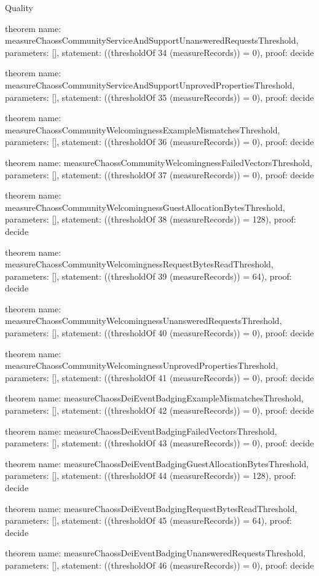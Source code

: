 \begin{lexlean}{Quality}
\begin{semanticmodule}
theorem{
  name: measureChaossCommunityServiceAndSupportUnansweredRequestsThreshold,
  parameters: [],
  statement: ((thresholdOf 34 (measureRecords)) = 0),
  proof: decide{}
}

theorem{
  name: measureChaossCommunityServiceAndSupportUnprovedPropertiesThreshold,
  parameters: [],
  statement: ((thresholdOf 35 (measureRecords)) = 0),
  proof: decide{}
}

theorem{
  name: measureChaossCommunityWelcomingnessExampleMismatchesThreshold,
  parameters: [],
  statement: ((thresholdOf 36 (measureRecords)) = 0),
  proof: decide{}
}

theorem{
  name: measureChaossCommunityWelcomingnessFailedVectorsThreshold,
  parameters: [],
  statement: ((thresholdOf 37 (measureRecords)) = 0),
  proof: decide{}
}

theorem{
  name: measureChaossCommunityWelcomingnessGuestAllocationBytesThreshold,
  parameters: [],
  statement: ((thresholdOf 38 (measureRecords)) = 128),
  proof: decide{}
}

theorem{
  name: measureChaossCommunityWelcomingnessRequestBytesReadThreshold,
  parameters: [],
  statement: ((thresholdOf 39 (measureRecords)) = 64),
  proof: decide{}
}

theorem{
  name: measureChaossCommunityWelcomingnessUnansweredRequestsThreshold,
  parameters: [],
  statement: ((thresholdOf 40 (measureRecords)) = 0),
  proof: decide{}
}

theorem{
  name: measureChaossCommunityWelcomingnessUnprovedPropertiesThreshold,
  parameters: [],
  statement: ((thresholdOf 41 (measureRecords)) = 0),
  proof: decide{}
}

theorem{
  name: measureChaossDeiEventBadgingExampleMismatchesThreshold,
  parameters: [],
  statement: ((thresholdOf 42 (measureRecords)) = 0),
  proof: decide{}
}

theorem{
  name: measureChaossDeiEventBadgingFailedVectorsThreshold,
  parameters: [],
  statement: ((thresholdOf 43 (measureRecords)) = 0),
  proof: decide{}
}

theorem{
  name: measureChaossDeiEventBadgingGuestAllocationBytesThreshold,
  parameters: [],
  statement: ((thresholdOf 44 (measureRecords)) = 128),
  proof: decide{}
}

theorem{
  name: measureChaossDeiEventBadgingRequestBytesReadThreshold,
  parameters: [],
  statement: ((thresholdOf 45 (measureRecords)) = 64),
  proof: decide{}
}

theorem{
  name: measureChaossDeiEventBadgingUnansweredRequestsThreshold,
  parameters: [],
  statement: ((thresholdOf 46 (measureRecords)) = 0),
  proof: decide{}
}


\end{semanticmodule}
\end{lexlean}
